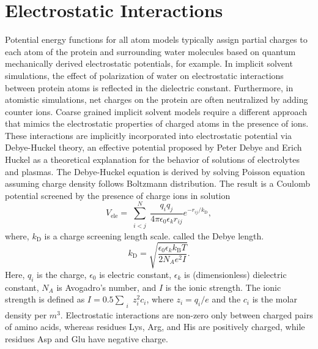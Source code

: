 \documentclass[../talant.diss.submit.tex]{subfiles}
\begin{document}
\clearpage
%
\section{\textbf{Electrostatic Interactions}}\label{sect:two_three}

Potential energy functions for all atom models
typically assign partial charges to each atom of the protein and surrounding water
molecules based on quantum mechanically derived electrostatic potentials, for example.
In implicit solvent simulations, the effect of polarization of water on electrostatic
interactions between protein atoms is reflected in the dielectric constant. 
Furthermore, in atomistic simulations, net charges on the protein are often neutralized by
adding counter ions. 
Coarse grained implicit solvent models require a different
approach that mimics the  electrostatic properties of charged atoms in the presence of ions.
These interactions are implicitly incorporated into electrostatic potential
via Debye-Huckel theory, an effective potential proposed by Peter Debye and Erich Huckel
as a theoretical explanation for the behavior of solutions of electrolytes
and plasmas\cite{debye:23th}.
The Debye-Huckel equation is derived by solving Poisson equation assuming charge
density follows Boltzmann distribution. The result is a Coulomb potential screened by
the presence of charge ions in solution
\begin{equation}
  \label{eq:deb_huc}
  V_{\mathrm{ele}} = \sum_{\substack{i<j}}^{N} \!
  \frac{q_i q_j }{4\pi \epsilon_0 \epsilon_k r_{ij}}
  e^{-r_{ij}/k_{\mathrm{D}}},
\end{equation}
where, $k_{\mathrm{D}}$ is a charge screening length scale. called the Debye length.
\begin{equation}
  \label{eq:kD}
  k_{\mathrm{D}} = \sqrt{\frac{\epsilon_0 \epsilon_k k_{\mathrm{B}} T}{2 N_A e^2 I}}.
\end{equation}
Here, $q_i$ is the charge, $\epsilon_0$ is electric constant, $\epsilon_k$ is (dimensionless) dielectric
constant, $N_A$ is Avogadro's number, and $I$ is the ionic strength.
The ionic strength is defined as $I = 0.5 \sum_{\substack{i}} z_{i}^{2} c_i$, where $z_i = q_i /e$ and the
$c_i$ is the molar density per $m^3$. Electrostatic interactions are non-zero only between charged pairs
of amino acids, whereas residues Lys, Arg, and His are positively charged, while residues Asp and Glu have
negative charge.
\end{document}
